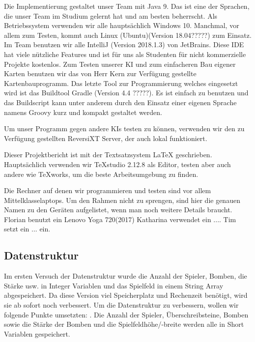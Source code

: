 \documentclass[12pt,a4paper,bibliography=totocnumbered,listof=totocnumbered]{scrartcl}
\begin{document}
Die Implementierung gestaltet unser Team mit Java 9. Das ist eine der Sprachen, die unser Team im Studium gelernt hat und am besten beherrscht. Als Betriebssystem verwenden wir alle hauptsächlich Windows 10. Manchmal, vor allem zum Testen, kommt auch Linux (Ubuntu)(Version 18.04?????) zum Einsatz. Im Team benutzen wir alle IntelliJ (Version 2018.1.3) von JetBrains. Diese IDE hat viele nützliche Features und ist für uns als Studenten für nicht kommerzielle Projekte kostenlos. Zum Testen unserer KI und zum einfacheren Bau eigener Karten benutzen wir das von Herr Kern zur Verfügung gestellte Kartenbauprogramm.
 Das letzte Tool zur Programmierung welches eingesetzt wird ist das Buildtool Gradle (Version 4.4 ?????). Es ist einfach zu benutzen und das Buildscript kann unter anderem durch den Einsatz einer eigenen Sprache namens Groovy kurz und kompakt gestaltet werden.

Um unser Programm gegen andere KIs testen zu können, verwenden wir den zu Verfügung gestellten ReversiXT Server, der auch lokal funktioniert.

Dieser Projektbericht ist mit der Textsatzsystem LaTeX geschrieben. Hauptsächlich verwenden wir TeXstudio 2.12.8 als Editor, testen aber auch andere wie TeXworks, um die beste Arbeitsumgebung zu finden.

Die Rechner auf denen wir programmieren und testen sind vor allem \glqq Mittelklasselaptops\grqq. Um den Rahmen nicht zu sprengen, sind hier die genauen Namen zu den Geräten aufgelistet, wenn man noch weitere Details braucht. Florian benutzt ein Lenovo Yoga 720(2017) %
Katharina verwendet ein ....%
Tim setzt ein ... ein.%

\subsection{Datenstruktur}
Im ersten Versuch der Datenstruktur wurde die Anzahl der Spieler, Bomben, die Stärke usw. in Integer Variablen und das Spielfeld in einem String Array abgespeichert. Da diese Version viel Speicherplatz und Rechenzeit benötigt, wird sie ab sofort noch verbessert.
Um die Datenstruktur zu verbessern, wollen wir folgende Punkte umsetzten:
. Die Anzahl der Spieler, Überschreibsteine, Bomben sowie die Stärke der Bomben und die Spielfeldhöhe/-breite werden alle in Short Variablen gespeichert. 
\end{document}
